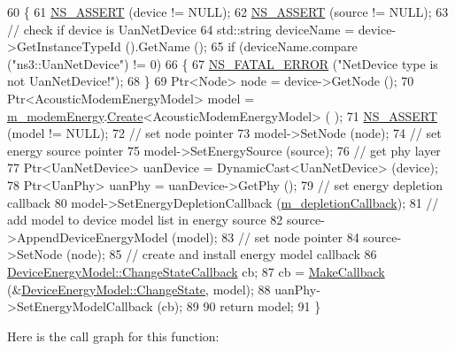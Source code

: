 \begin{DoxyCode}
60 \{
61   \hyperlink{assert_8h_a6dccdb0de9b252f60088ce281c49d052}{NS\_ASSERT} (device != NULL);
62   \hyperlink{assert_8h_a6dccdb0de9b252f60088ce281c49d052}{NS\_ASSERT} (source != NULL);
63   \textcolor{comment}{// check if device is UanNetDevice}
64   std::string deviceName = device->GetInstanceTypeId ().GetName ();
65   \textcolor{keywordflow}{if} (deviceName.compare (\textcolor{stringliteral}{"ns3::UanNetDevice"}) != 0)
66     \{
67       \hyperlink{group__fatal_ga5131d5e3f75d7d4cbfd706ac456fdc85}{NS\_FATAL\_ERROR} (\textcolor{stringliteral}{"NetDevice type is not UanNetDevice!"});
68     \}
69   Ptr<Node> node = device->GetNode ();
70   Ptr<AcousticModemEnergyModel> model = \hyperlink{classns3_1_1AcousticModemEnergyModelHelper_a1bd2876f2988dd9e4eb51013d4f553e1}{m\_modemEnergy}.\hyperlink{classns3_1_1ObjectFactory_a18152e93f0a6fe184ed7300cb31e9896}{Create}<AcousticModemEnergyModel> (
      );
71   \hyperlink{assert_8h_a6dccdb0de9b252f60088ce281c49d052}{NS\_ASSERT} (model != NULL);
72   \textcolor{comment}{// set node pointer}
73   model->SetNode (node);
74   \textcolor{comment}{// set energy source pointer}
75   model->SetEnergySource (source);
76   \textcolor{comment}{// get phy layer}
77   Ptr<UanNetDevice> uanDevice = DynamicCast<UanNetDevice> (device);
78   Ptr<UanPhy> uanPhy = uanDevice->GetPhy ();
79   \textcolor{comment}{// set energy depletion callback}
80   model->SetEnergyDepletionCallback (\hyperlink{classns3_1_1AcousticModemEnergyModelHelper_a3b1b49f8077c22354bb5eccff83d3910}{m\_depletionCallback});
81   \textcolor{comment}{// add model to device model list in energy source}
82   source->AppendDeviceEnergyModel (model);
83   \textcolor{comment}{// set node pointer}
84   source->SetNode (node);
85   \textcolor{comment}{// create and install energy model callback}
86   \hyperlink{classns3_1_1DeviceEnergyModel_a26632ed1b86ee8f6c7fc4c756f0027ad}{DeviceEnergyModel::ChangeStateCallback} cb;
87   cb = \hyperlink{group__makecallbackmemptr_ga9376283685aa99d204048d6a4b7610a4}{MakeCallback} (&\hyperlink{classns3_1_1DeviceEnergyModel_a332be7863f3e8258743811077dde7f39}{DeviceEnergyModel::ChangeState}, model);
88   uanPhy->SetEnergyModelCallback (cb);
89 
90   \textcolor{keywordflow}{return} model;
91 \}
\end{DoxyCode}


Here is the call graph for this function\+:


